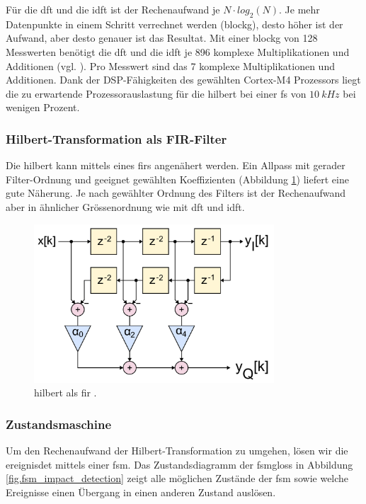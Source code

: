 Für die \gls{dft} und die \gls{idft} ist der Rechenaufwand je \ensuremath{N \cdot log_2(N)}. Je mehr Datenpunkte in einem Schritt verrechnet werden (\gls{blockg}), desto höher ist der Aufwand, aber desto genauer ist das Resultat. Mit einer \gls{blockg} von 128 Messwerten benötigt die \gls{dft} und die \gls{idft} je 896 komplexe Multiplikationen und Additionen (vgl. \cite[Kap. 3, S. 48]{dsv1_hilbert}). Pro Messwert sind das 7 komplexe Multiplikationen und Additionen. Dank der DSP-Fähigkeiten des gewählten Cortex\texttrademark -M4 Prozessors liegt die zu erwartende Prozessorauslastung für die \gls{hilbert} bei einer \gls{fs} von \ensuremath{10~kHz} bei wenigen Prozent.

\subsubsection{Hilbert-Transformation als FIR-Filter}
Die \gls{hilbert} kann mittels eines \gls{fir}s angenähert werden. Ein Allpass mit gerader Filter-Ordnung und geeignet gewählten Koeffizienten (Abbildung \ref{fig.hilbertFIR}) liefert eine gute Näherung. Je nach gewählter Ordnung des Filters ist der Rechenaufwand aber in ähnlicher Grössenordnung wie mit \gls{dft} und \gls{idft}.
\begin{figure}
	\centering
		\includegraphics[width=0.8\textwidth]{images/FIR_Hilbert_Transform_Filter.png}
	\caption{\gls{hilbert} als \gls{fir} \cite{wiki_hilbertFIR}.}
	\label{fig.hilbertFIR}
\end{figure}

\subsubsection{Zustandsmaschine}
Um den Rechenaufwand der Hilbert-Transformation zu umgehen, lösen wir die \gls{ereignisdet} mittels einer \gls{fsm}. Das Zustandsdiagramm der \gls{fsmgloss} in Abbildung \ref{fig.fsm_impact_detection} zeigt alle möglichen Zustände der \gls{fsm} sowie welche Ereignisse einen Übergang in einen anderen Zustand auslösen.

